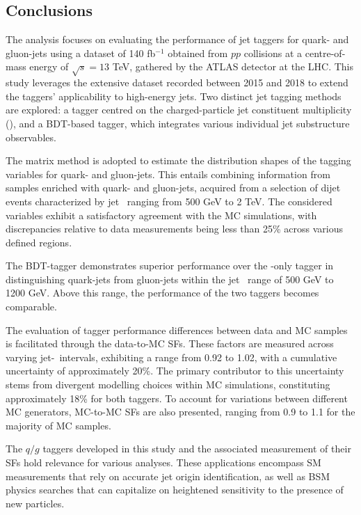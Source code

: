 \FloatBarrier
\subsection{Conclusions}
The analysis focuses on evaluating the performance of jet taggers for quark- and gluon-jets using a dataset of 140 fb$^{-1}$ obtained from $pp$ collisions at a centre-of-mass energy of $\sqrt{s} = 13$ TeV, gathered by the ATLAS detector at the LHC. This study leverages the extensive dataset recorded between 2015 and 2018 to extend the taggers' applicability to high-energy jets. Two distinct jet tagging methods are explored: a tagger centred on the charged-particle jet constituent multiplicity (\ntrk), and a BDT-based tagger, which integrates various individual jet substructure observables. 

The matrix method is adopted to estimate the distribution shapes of the tagging variables for quark- and gluon-jets. This entails combining information from samples enriched with quark- and gluon-jets, acquired from a selection of dijet events characterized by jet \pt~ranging from 500 GeV to 2 TeV. The considered variables exhibit a satisfactory agreement with the MC simulations, with discrepancies relative to data measurements being less than 25\% across various defined regions. 

The BDT-tagger demonstrates superior performance over the \ntrk-only tagger in distinguishing quark-jets from gluon-jets within the jet \pt~range of 500 GeV to 1200 GeV. Above this range, the performance of the two taggers becomes comparable. 

The evaluation of tagger performance differences between data and MC samples is facilitated through the data-to-MC SFs. These factors are measured across varying jet-\pt~intervals, exhibiting a range from 0.92 to 1.02, with a cumulative uncertainty of approximately 20\%. The primary contributor to this uncertainty stems from divergent modelling choices within MC simulations, constituting approximately 18\% for both taggers. To account for variations between different MC generators, MC-to-MC SFs are also presented, ranging from 0.9 to 1.1 for the majority of MC samples.

The $q/g$ taggers developed in this study and the associated measurement of their SFs hold relevance for various analyses. These applications encompass SM measurements that rely on accurate jet origin identification, as well as BSM physics searches that can capitalize on heightened sensitivity to the presence of new particles.

